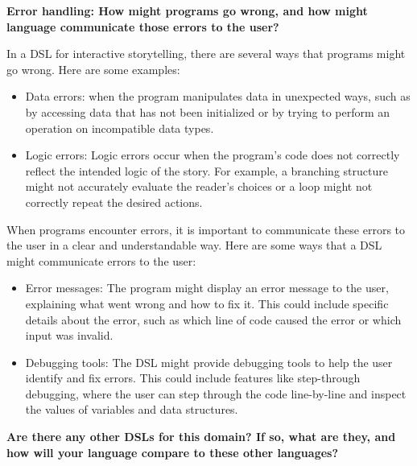 \textbf {Error handling: How might programs go wrong, and how might  language communicate those errors to the user?}

In a DSL for interactive storytelling, there are several ways that programs might go wrong. Here are some examples:
\begin{itemize}
                \item Data errors: when the program manipulates data in unexpected ways, such as by accessing data that has not been initialized or by trying to perform an operation on incompatible data types.
                \item Logic errors: Logic errors occur when the program's code does not correctly reflect the intended logic of the story. For example, a branching structure might not accurately evaluate the reader's choices or a loop might not correctly repeat the desired actions.
 \end{itemize}
When programs encounter errors, it is important to communicate these errors to the user in a clear and understandable way. Here are some ways that a DSL might communicate errors to the user:
\begin{itemize}
                \item Error messages: The program might display an error message to the user, explaining what went wrong and how to fix it. This could include specific details about the error, such as which line of code caused the error or which input was invalid.
                \item Debugging tools: The DSL might provide debugging tools to help the user identify and fix errors. This could include features like step-through debugging, where the user can step through the code line-by-line and inspect the values of variables and data structures.
 \end{itemize}
 
\textbf {Are there any other DSLs for this domain? If so, what are they, and how will your language compare to these other languages?} 


